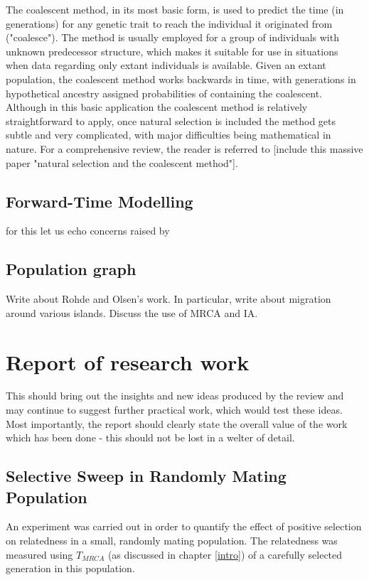 \documentclass{l4proj}
\begin{document}
The coalescent method, in its most basic form, is used to predict the time (in generations) for any genetic trait to reach the individual it originated from ("coalesce"). The method is usually employed for a group of individuals with unknown predecessor structure, which makes it suitable for use in situations when data regarding only extant individuals is available. Given an extant population, the coalescent method works backwards in time, with generations in hypothetical ancestry assigned probabilities of containing the coalescent. Although in this basic application the coalescent method is relatively straightforward to apply, once natural selection is included the method gets subtle and very complicated, with major difficulties being mathematical in nature. For a comprehensive review, the reader is referred to [include this massive paper "natural selection and the coalescent method"]. 

\section{Forward-Time Modelling}

for this let us echo concerns raised by \cite{peng10}

\section{Population graph}

Write about Rohde and Olsen's work. In particular, write about migration around various islands. Discuss the use of MRCA and IA.

\chapter{Report of research work}\label{research}
This should bring out the insights and new ideas produced by the review and may continue to suggest further practical work, which would test these ideas. Most importantly, the report should clearly state the overall value of the work which has been done - this should not be lost in a welter of detail.

\section{Selective Sweep in Randomly Mating Population}

An experiment was carried out in order to quantify the effect of positive selection on relatedness in a small, randomly mating population. The relatedness was measured using $T_{MRCA}$ (as discussed in chapter \ref{intro}) of a carefully selected generation in this population.
\end{document}
